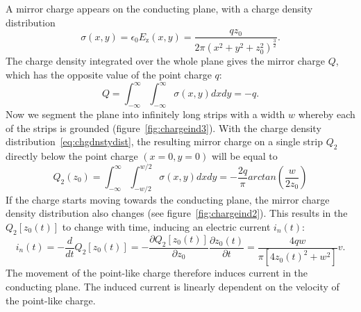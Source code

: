 A mirror charge appears on the conducting plane, with a charge density distribution
\begin{equation}
\label{eq:chgdnstydist}
\sigma(x,y)=\epsilon_\mathrm{0}E_\mathrm{z}(x,y)=\frac{qz_\mathrm{0}}{2\pi(x^2+y^2+z_0^2)^\frac{3}{2}}.
\end{equation}
The charge density integrated over the whole plane gives the mirror charge $Q$, which has the opposite value of the point charge $q$:
\begin{equation}
\label{eq:chargedensity}
Q=\int_{-\infty}^{\infty} \int_{-\infty}^{\infty} \sigma(x,y)dxdy = -q.
\end{equation}
Now we segment the plane into infinitely long strips with a width $w$ whereby each of the strips is grounded (figure~\ref{fig:chargeind3}). With the charge density distribution~\ref{eq:chgdnstydist}, the resulting mirror charge on a single strip $Q_\mathrm{2}$ directly below the point charge $(x=0, y=0)$ will be equal to
\begin{equation}
\label{eq:stripcharge}
Q_\mathrm{2}(z_\mathrm{0})=\int_{-\infty}^{\infty}\int_{-w/2}^{w/2}\sigma(x,y)dxdy = -\frac{2q}{\pi}arctan\left(\frac{w}{2z_\mathrm{0}}\right)
\end{equation} 
If the charge starts moving towards the conducting plane, the mirror charge density distribution also changes (see figure~\ref{fig:chargeind2}). This results in the $Q_2[z_0(t)]$ to change with time, inducing an electric current $i_n(t)$:
 \begin{equation}
 \label{eq:indcurr}
 i_n(t) = -\frac{d}{dt}Q_\mathrm{2}[z_\mathrm{0}(t)] = -\frac{\partial Q_\mathrm{2}[z_\mathrm{0}(t)]}{\partial z_\mathrm{0}}\frac{\partial z_\mathrm{0}(t)}{\partial t} = \frac{4qw}{\pi[4z_\mathrm{0}(t)^2 + w^2]}v. 
 \end{equation}
 The movement of the point-like charge therefore induces current in the conducting plane. The induced current is linearly dependent on the velocity of the point-like charge.

